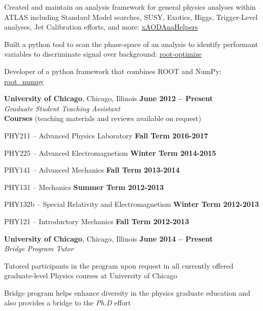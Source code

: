 \documentclass[margin,line]{resume}
\begin{document}
\begin{resume}
\begin{list2}
  \item Created and maintain an analysis framework for general physics analyses within ATLAS including Standard Model searches, SUSY, Exotics, Higgs, Trigger-Level analyses, Jet Calibration efforts, and more: \href{https://xaodanahelpers.readthedocs.io/en/master/}{xAODAnaHelpers} \cite{giordon_stark_2015_839037}
  \item Built a python tool to scan the phase-space of an analysis to identify performant variables to discriminate signal over background: \href{https://github.com/kratsg/Optimization}{root-optimize}
  \item Developer of a python framework that combines ROOT and NumPy: \href{http://scikit-hep.org/root_numpy/}{root\_numpy} \cite{Noel_Dawe_2017}
\end{list2}

\newpage

\textbf{University of Chicago}, Chicago, Illinois \hfill \textbf{June 2012 -- Present}\\
\textsl{Graduate Student Teaching Assistant}\\
\textbf{Courses} (teaching materials and reviews available on request)
\begin{list2}
  \item PHY211 -- Advanced Physics Laboratory \hfill \textbf{Fall Term 2016-2017}
  \item PHY225 -- Advanced Electromagnetism \hfill \textbf{Winter Term 2014-2015}
  \item PHY141 -- Advanced Mechanics \hfill \textbf{Fall Term 2013-2014}
  \item PHY131 -- Mechanics \hfill \textbf{Summer Term 2012-2013}
  \item PHY132b -- Special Relativity and Electromagnetism \hfill \textbf{Winter Term 2012-2013}
  \item PHY121 -- Introductory Mechanics \hfill \textbf{Fall Term 2012-2013}
\end{list2}

\textbf{University of Chicago}, Chicago, Illinois \hfill \textbf{June 2014 -- Present}\\
\textsl{Bridge Program Tutor}
\begin{list2}
  \item Tutored participants in the program upon request in all currently offered graduate-level Physics courses at University of Chicago
  \item Bridge program helps enhance diversity in the physics graduate education and also provides a bridge to the \textsl{Ph.D} effort
\end{list2}


\end{resume}
\end{document}
